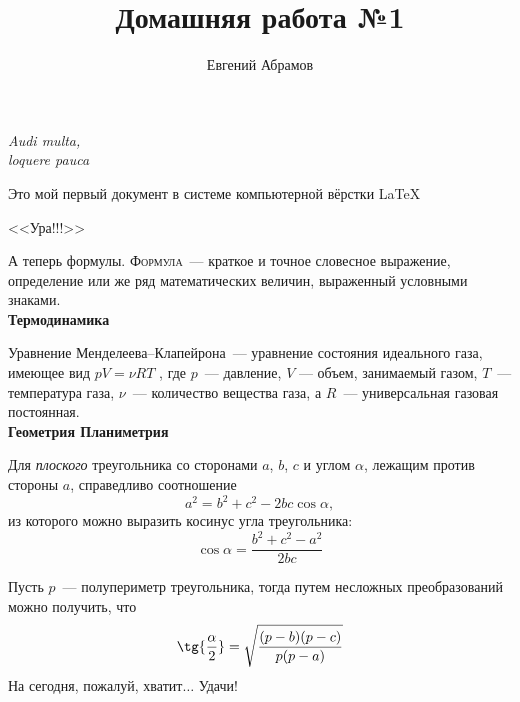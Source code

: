 \documentclass[12pt]{article}
\title{Домашняя работа №1}
\author{Евгений Абрамов}
\date{}
\begin{document}
	\maketitle
	\begin{flushright}
	\textit{Audi multa,\\ loquere pauca}
	\end{flushright}
	\vspace{20pt}
	\par Это мой первый документ в системе компьютерной вёрстки \LaTeX
	\begin{center}
	\huge{\textsf{<<Ура!!!>>}}
	\end{center}
	
	А теперь формулы. \textsc{Формула}~--- краткое и точное словесное выражение, определение или же ряд математических величин, выраженный условными знаками.
	\vspace{15pt}\\
	\hspace*{28pt}\textbf{\Large{Термодинамика}}
	
	Уравнение Менделеева--Клапейрона~--- уравнение состояния идеального газа, имеющее вид $pV = \nu RT$ , где $p$~--- давление, $V$ — объем, занимаемый газом, $T$~--- температура газа, $\nu$~--- количество вещества газа, а $R$~--- универсальная газовая постоянная.
	\vspace{15pt}\\
	\hspace*{28pt}\textbf{\Large{Геометрия \hfill Планиметрия}} 
	
	Для \textsl{плоского} треугольника со сторонами $a$, $b$, $c$ и углом $\alpha$, лежащим
против стороны $a$, справедливо соотношение
$$a^2 = b^2+ c^2 - 2bc\cos\alpha,$$
из которого можно выразить косинус угла треугольника:
$$\cos \alpha = \frac{b^2 + c^2 - a^2}{2bc}$$

Пусть $p$~--- полупериметр треугольника, тогда путем несложных преобразований можно получить, что
$$\tg{\frac{\alpha}{2}} = \sqrt{\frac{(p - b)(p - c)}{p(p - a)}}$$
	\vspace*{1cm}
	\hspace*{0pt}На сегодня, пожалуй, хватит$\ldots$ Удачи!
\end{document}
